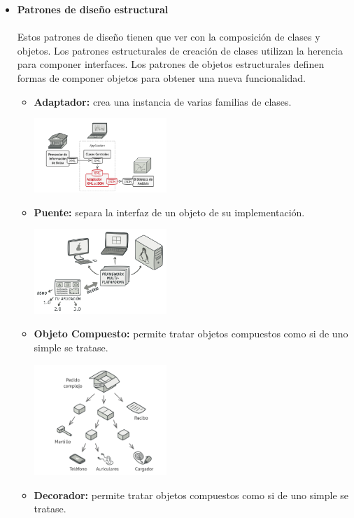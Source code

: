 \documentclass[twoside,twocolumn]{article}
\begin{document}
\begin{itemize}
	\item \textbf{Patrones de diseño estructural}
	\\
	\\Estos patrones de diseño tienen que ver con la composición de clases y objetos. Los patrones estructurales de creación de clases utilizan la herencia para componer interfaces. Los patrones de objetos estructurales definen formas de componer objetos para obtener una nueva funcionalidad.\cite{r}
	\begin{itemize}
		\item \textbf{Adaptador:}	crea una instancia de varias familias de clases.
			\begin{center}
			\includegraphics[width=5cm]{./Imagenes/7} 
		\end{center}
		\item \textbf{Puente:} separa la interfaz de un objeto de su implementación.
		\begin{center}
			\includegraphics[width=5cm]{./Imagenes/8} 
		\end{center}
		\item \textbf{Objeto Compuesto:} permite tratar objetos compuestos como si de uno simple se tratase.
			\begin{center}
			\includegraphics[width=5cm]{./Imagenes/9} 
		\end{center}
		\item \textbf{Decorador:}	permite tratar objetos compuestos como si de uno simple se tratase.

\end{itemize}
\end{itemize}
\end{document}
